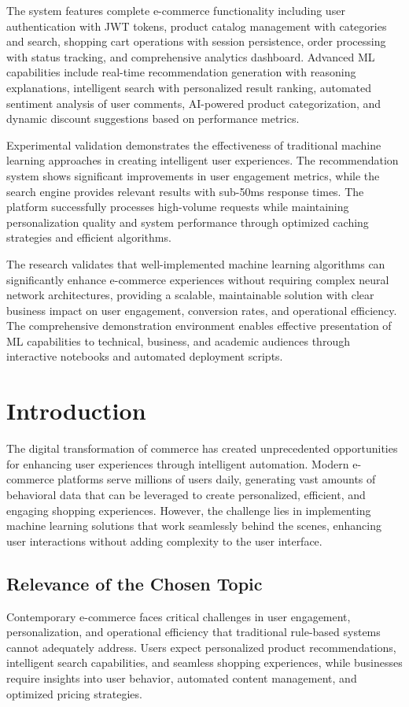 \documentclass[12pt]{article}
\begin{document}
The system features complete e-commerce functionality including user authentication with JWT tokens, product catalog management with categories and search, shopping cart operations with session persistence, order processing with status tracking, and comprehensive analytics dashboard. Advanced ML capabilities include real-time recommendation generation with reasoning explanations, intelligent search with personalized result ranking, automated sentiment analysis of user comments, AI-powered product categorization, and dynamic discount suggestions based on performance metrics.

Experimental validation demonstrates the effectiveness of traditional machine learning approaches in creating intelligent user experiences. The recommendation system shows significant improvements in user engagement metrics, while the search engine provides relevant results with sub-50ms response times. The platform successfully processes high-volume requests while maintaining personalization quality and system performance through optimized caching strategies and efficient algorithms.

The research validates that well-implemented machine learning algorithms can significantly enhance e-commerce experiences without requiring complex neural network architectures, providing a scalable, maintainable solution with clear business impact on user engagement, conversion rates, and operational efficiency. The comprehensive demonstration environment enables effective presentation of ML capabilities to technical, business, and academic audiences through interactive notebooks and automated deployment scripts.

\newpage

\section{Introduction}
The digital transformation of commerce has created unprecedented opportunities for enhancing user experiences through intelligent automation. Modern e-commerce platforms serve millions of users daily, generating vast amounts of behavioral data that can be leveraged to create personalized, efficient, and engaging shopping experiences. However, the challenge lies in implementing machine learning solutions that work seamlessly behind the scenes, enhancing user interactions without adding complexity to the user interface.

\subsection{Relevance of the Chosen Topic}
Contemporary e-commerce faces critical challenges in user engagement, personalization, and operational efficiency that traditional rule-based systems cannot adequately address. Users expect personalized product recommendations, intelligent search capabilities, and seamless shopping experiences, while businesses require insights into user behavior, automated content management, and optimized pricing strategies.
\end{document}
